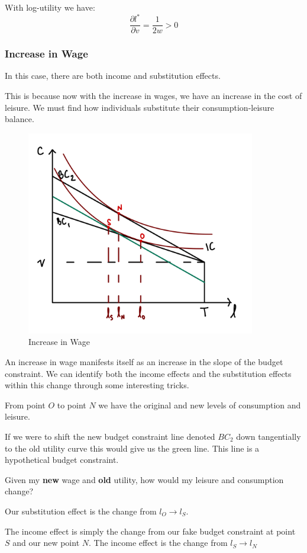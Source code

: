 \documentclass[11pt]{article}
\begin{document}
\begin{example}
With log-utility we have:
\[\dfrac{\partial l^*}{\partial v} = \dfrac{1}{2w}>0\]
\end{example}

\subsubsection{Increase in Wage}
In this case, there are both income and substitution effects. 
\begin{intu}
    This is because now with the increase in wages, we have an increase in the cost of leisure. We must find how individuals substitute their consumption-leisure balance.
\end{intu}

\begin{figure}[h]
    \centering
    \includegraphics[width=10cm]{photos/shift in w.jpeg}
    \caption{Increase in Wage}
    \label{fig:increase in w}
\end{figure}

An increase in wage manifests itself as an increase in the slope of the budget constraint. We can identify both the income effects and the substitution effects within this change through some interesting tricks.

\begin{deriv}
    From point $O$ to point $N$ we have the original and new levels of consumption and leisure. 
    
    If we were to shift the new budget constraint line denoted $BC_2$ down tangentially to the old utility curve this would give us the \textcolor{OliveGreen}{green line}. This line is a hypothetical budget constraint.
    \begin{intu}
        Given my \textbf{new} wage and \textbf{old} utility, how would my leisure and consumption change?
    \end{intu}

    Our substitution effect is the change from $l_O \rightarrow l_S$.

    The income effect is simply the change from our fake budget constraint at point $S$ and our new point $N$. The income effect is the change from $l_S \rightarrow l_N$
\end{deriv}
\end{document}
